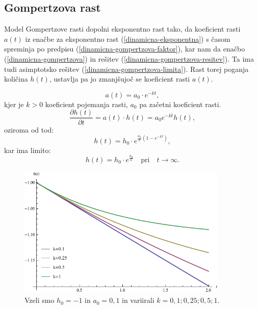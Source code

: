 \documentclass[a4paper, twoside, 12pt]{book}
\begin{document}
    \subsection{Gompertzova rast}

    Model Gompertzove rasti dopolni eksponentno rast tako, da koeficient rasti $a(t)$ iz enačbe za eksponentno rast (\ref{dinamicna-eksponentna}) s časom spreminja po predpisu (\ref{dinamicna-gompertzova-faktor}), kar nam da enačbo (\ref{dinamicna-gompertzova}) in rešitev (\ref{dinamicna-gompertzova-resitev}). Ta ima tudi asimptotsko rešitev (\ref{dinamicna-gompertzova-limita}). Rast torej poganja količina $h(t)$, ustavlja pa jo zmanjšujoč se koeficient rasti $a(t)$.

    \begin{equation}
      a(t) = a_0 \cdot e^{- k t},
      \label{dinamicna-gompertzova-faktor}
    \end{equation}
kjer je $k > 0$ koeficient pojemanja rasti, $a_0$ pa začetni koeficient rasti.
    \begin{equation}
      \frac{\partial h(t)}{\partial t} = a(t) \cdot h(t) = a_0 e^{ -k t} h(t),
      \label{dinamicna-gompertzova}
    \end{equation}
oziroma od tod:
    \begin{equation}
      h(t) = h_0 \cdot e^{\frac{a_0}{k}(1-e^{-kt})},
      \label{dinamicna-gompertzova-resitev}
    \end{equation}
kar ima limito:
    \begin{equation}
      h(t) = h_0 \cdot e^{\frac{a_0}{k}} \quad \text{pri} \quad t \rightarrow \infty.
      \label{dinamicna-gompertzova-limita}
    \end{equation}

    \begin{figure}[h!]
      \begin{center}
        \includegraphics[width=10cm]{slike/gompertzova-rast}
      \end{center}
      \caption{Vzeli smo $h_0=-1$ in $a_0=0,1$ in variirali $k=0,1;0,25;0,5;1$.}
      \label{fig:gompertzova-rast}
    \end{figure}
\end{document}

